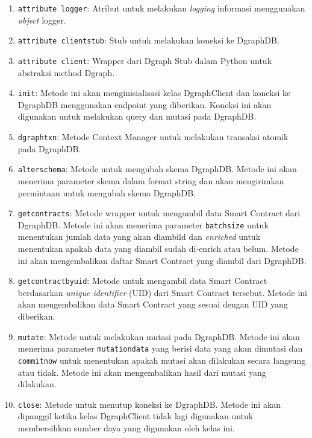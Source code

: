 \begin{enumerate}
	\item \texttt{attribute logger}: Atribut untuk melakukan \textit{logging} informasi menggunakan \textit{object} logger.
	\item \texttt{attribute client\textunderscore stub}: Stub untuk melakukan koneksi ke DgraphDB.
	\item \texttt{attribute client}: Wrapper dari Dgraph Stub dalam Python untuk abstraksi method Dgraph.
	\item \texttt{\textunderscore\textunderscore init\textunderscore\textunderscore}: Metode ini akan menginisialisasi kelas DgraphClient dan koneksi ke DgraphDB menggunakan endpoint yang diberikan. Koneksi ini akan digunakan untuk melakukan query dan mutasi pada DgraphDB.
	\item \texttt{dgraph\textunderscore txn}: Metode Context Manager untuk melakukan transaksi atomik pada DgraphDB.
	\item \texttt{alter\textunderscore schema}: Metode untuk mengubah skema DgraphDB. Metode ini akan menerima parameter skema dalam format string dan akan mengirimkan permintaan untuk mengubah skema DgraphDB.
	\item \texttt{get\textunderscore contracts}: Metode wrapper untuk mengambil data Smart Contract dari DgraphDB. Metode ini akan menerima parameter \texttt{batch\textunderscore size} untuk menentukan jumlah data yang akan diambild dan \textit{enriched} untuk menentukan apakah data yang diambil sudah di-enrich atau belum. Metode ini akan mengembalikan daftar Smart Contract yang diambil dari DgraphDB.
	\item \texttt{get\textunderscore contract\textunderscore by\textunderscore uid}: Metode untuk mengambil data Smart Contract berdasarkan \textit{unique identifier} (UID) dari Smart Contract tersebut. Metode ini akan mengembalikan data Smart Contract yang sesuai dengan UID yang diberikan.
	\item \texttt{mutate}: Metode untuk melakukan mutasi pada DgraphDB. Metode ini akan menerima parameter \texttt{mutation\textunderscore data} yang berisi data yang akan dimutasi dan \texttt{commit\textunderscore now} untuk menentukan apakah mutasi akan dilakukan secara langsung atau tidak. Metode ini akan mengembalikan hasil dari mutasi yang dilakukan.
	\item \texttt{close}: Metode untuk menutup koneksi ke DgraphDB. Metode ini akan dipanggil ketika kelas DgraphClient tidak lagi digunakan untuk membersihkan sumber daya yang digunakan oleh kelas ini.
\end{enumerate}

